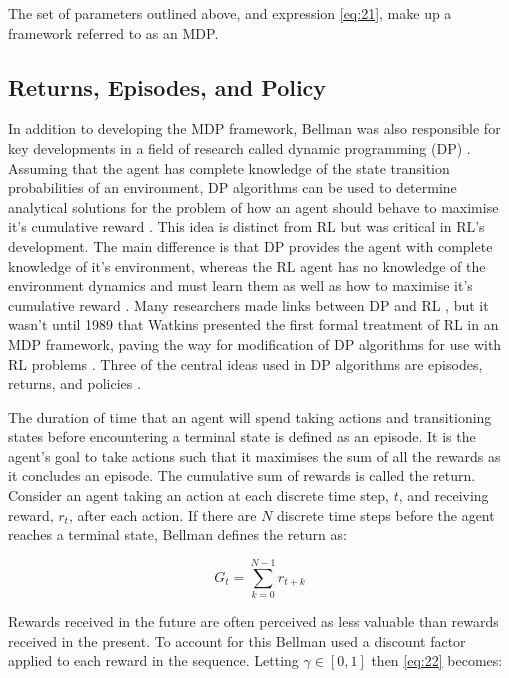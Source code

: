 The set of parameters outlined above, and expression \ref{eq:21}, make up a framework referred to as an MDP.


\subsection{Returns, Episodes, and Policy} \label{rep}
In addition to  developing the MDP framework, Bellman was also responsible for key developments in a field of research called dynamic programming (DP) \cite{Bellm1954}. Assuming that the agent has complete knowledge of the state transition probabilities of an environment, DP algorithms can be used to determine analytical solutions for the problem of how an agent should behave to maximise it's cumulative reward \cite{Bellm1954, Howard1960}. This idea is distinct from RL but was critical in RL's development. The main difference is that DP provides the agent with complete knowledge of it's environment, whereas the RL agent has no knowledge of the environment dynamics and must learn them as well as how to maximise it's cumulative reward \cite{Sutton2018}. Many researchers made links between DP and RL \cite{Bellm1959, Witten1977, Werbos1987}, but it wasn't until 1989 that Watkins presented the first formal treatment of RL in an MDP framework, paving the way for modification of DP algorithms for use with RL problems \cite{Watkins1989}. Three of the central ideas used in DP algorithms are episodes, returns, and policies \cite{Sutton2018}.

The duration of time that an agent will spend taking actions and transitioning states before encountering a terminal state is defined as an episode. It is the agent's goal to take actions such that it maximises the sum of all the rewards as it concludes an episode. The cumulative sum of rewards is called the return. Consider an agent taking an action at each discrete time step, $t$, and receiving reward, $r_t$, after each action. If there are $N$ discrete time steps before the agent reaches a terminal state, Bellman defines the return as:

\begin{equation}
	G_t = \sum_{k = 0}^{N-1} r_{t + k} \label{eq:22}
\end{equation}

Rewards received in the future are often perceived as less valuable than rewards received in the present. To account for this Bellman used a discount factor applied to each reward in the sequence. Letting $\gamma \in [0,1]$ then \ref{eq:22} becomes:

